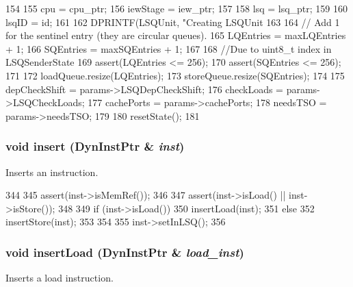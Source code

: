 \begin{DoxyCode}
154 {
155     cpu = cpu_ptr;
156     iewStage = iew_ptr;
157 
158     lsq = lsq_ptr;
159 
160     lsqID = id;
161 
162     DPRINTF(LSQUnit, "Creating LSQUnit%
163 
164     // Add 1 for the sentinel entry (they are circular queues).
165     LQEntries = maxLQEntries + 1;
166     SQEntries = maxSQEntries + 1;
167 
168     //Due to uint8_t index in LSQSenderState
169     assert(LQEntries <= 256);
170     assert(SQEntries <= 256);
171 
172     loadQueue.resize(LQEntries);
173     storeQueue.resize(SQEntries);
174 
175     depCheckShift = params->LSQDepCheckShift;
176     checkLoads = params->LSQCheckLoads;
177     cachePorts = params->cachePorts;
178     needsTSO = params->needsTSO;
179 
180     resetState();
181 }
\end{DoxyCode}
\hypertarget{classLSQUnit_a773e88db1aa010c3755e603493bf40ec}{
\subsubsection[{insert}]{\setlength{\rightskip}{0pt plus 5cm}void insert ({\bf DynInstPtr} \& {\em inst})}}
\label{classLSQUnit_a773e88db1aa010c3755e603493bf40ec}
Inserts an instruction. 


\begin{DoxyCode}
344 {
345     assert(inst->isMemRef());
346 
347     assert(inst->isLoad() || inst->isStore());
348 
349     if (inst->isLoad()) {
350         insertLoad(inst);
351     } else {
352         insertStore(inst);
353     }
354 
355     inst->setInLSQ();
356 }
\end{DoxyCode}
\hypertarget{classLSQUnit_ad22b3ecafed2bcd9c59fcab049a1cb98}{
\subsubsection[{insertLoad}]{\setlength{\rightskip}{0pt plus 5cm}void insertLoad ({\bf DynInstPtr} \& {\em load\_\-inst})}}
\label{classLSQUnit_ad22b3ecafed2bcd9c59fcab049a1cb98}
Inserts a load instruction. 


